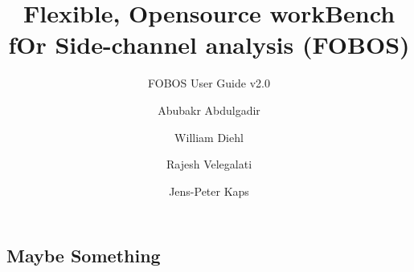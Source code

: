 \documentclass[twoside,11pt]{cergdoc}
\begin{document}
\title{Flexible, Opensource workBench fOr Side-channel analysis (FOBOS)}
\subtitle{FOBOS User Guide v2.0}
\author{Abubakr Abdulgadir \and William Diehl \and Rajesh Velegalati \and Jens-Peter Kaps}

\maketitle

\tableofcontents






\begin{appendix}
\chapter{Maybe Something}
\end{appendix}
\end{document}
